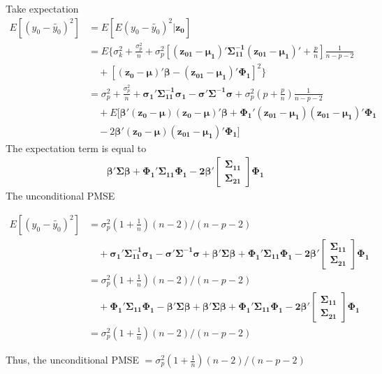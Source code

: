 \documentclass[11pt]{article}
\begin{document}
Take expectation
$$\begin{aligned}
E[(y_0-\tilde{y_0})^2]
&=E[E(y_0-\tilde{y_0})^2|\boldsymbol{z_0}]\\
&=E\{\sigma_k^2+\frac{\sigma_p^2}{n}+\sigma_p^2\left[\boldsymbol{(z_{01}-\mu_1)'\Sigma_{11}^{-1}(z_{01}-\mu_1)'}+\frac{p}{n}\right]\frac{1}{n-p-2}\\
&\quad+[\boldsymbol{(z_0-\mu)'\beta-(z_{01}-\mu_1)'\Phi_1}]^2\}\\
&=\sigma_p^2+\frac{\sigma_p^2}{n}+\boldsymbol{\sigma_1'\Sigma_{11}^{-1}\sigma_1-\sigma'\Sigma^{-1}\sigma}+\sigma_p^2\left(p+\frac{p}{n}\right)\frac{1}{n-p-2}\\
&\quad+E[\boldsymbol{\beta'(z_0-\mu)(z_0-\mu)'\beta+\Phi_1'(z_{01}-\mu_1)(z_{01}-\mu_1)'\Phi_1}\\
&\quad-2\boldsymbol{\beta'(z_0-\mu)(z_{01}-\mu_1)'\Phi_1}]
\end{aligned}$$
The expectation term is equal to
$$\begin{aligned}
&\boldsymbol{\beta'\Sigma\beta+\Phi_1'\Sigma_{11}\Phi_1-2\beta'}
\begin{bmatrix}\boldsymbol{\Sigma_{11}}\\
\boldsymbol{\Sigma_{21}}\end{bmatrix}\boldsymbol{\Phi_1}
\end{aligned}$$
The unconditional PMSE 

$$\begin{aligned}
E[(y_0-\tilde{y_0})^2] 
&= \sigma_p^2(1+\frac{1}{n})(n-2)/(n-p-2)\\
&\quad+\boldsymbol{\sigma_1'\Sigma_{11}^{-1}\sigma_1-\sigma'\Sigma^{-1}\sigma}+\boldsymbol{\beta'\Sigma\beta+\Phi_1'\Sigma_{11}\Phi_1-2\beta'}
\begin{bmatrix}\boldsymbol{\Sigma_{11}}\\
\boldsymbol{\Sigma_{21}}\end{bmatrix}\boldsymbol{\Phi_1}\\
&= \sigma_p^2(1+\frac{1}{n})(n-2)/(n-p-2)\\
&\quad+\boldsymbol{\Phi_1'\Sigma_{11}\Phi_1-\beta'\Sigma\beta}+\boldsymbol{\beta'\Sigma\beta+\Phi_1'\Sigma_{11}\Phi_1-2\beta'}
\begin{bmatrix}\boldsymbol{\Sigma_{11}}\\
\boldsymbol{\Sigma_{21}}\end{bmatrix}\boldsymbol{\Phi_1}\\
&= \sigma_p^2(1+\frac{1}{n})(n-2)/(n-p-2)
\end{aligned}$$

Thus, the unconditional PMSE $=\sigma_p^2(1+\frac{1}{n})(n-2)/(n-p-2)$
\end{document}
